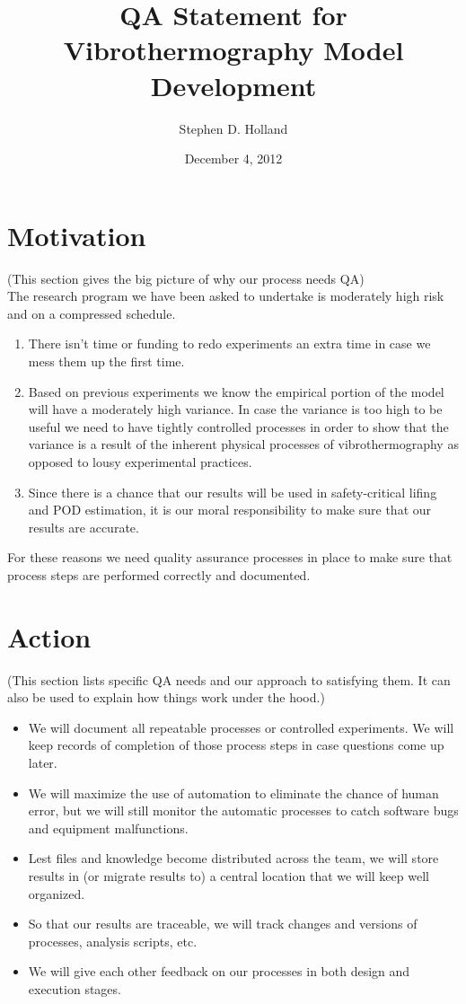 \documentclass{QAstatement}
\begin{document}
\title{QA Statement for Vibrothermography Model Development}
\author{Stephen D. Holland}
\date{December 4, 2012}

\maketitle

\section*{Motivation}
{\small (This section gives the big picture of why our process needs QA)} \\
The research program we have been asked to undertake is moderately 
high risk and on a compressed schedule. 
\begin{enumerate}
  \item There isn't time or funding to redo experiments an extra time in case we mess them up the first time. 
  \item Based on previous experiments we know the empirical portion of the 
model will have a moderately high variance. In case the variance is too 
high to be useful we need to have tightly controlled processes in order
to show that the variance is a result of the inherent physical processes
of vibrothermography as opposed to lousy experimental practices. 
  \item Since there is a chance that our results will be used in 
safety-critical lifing and POD estimation, it is our moral responsibility
to make sure that our results are accurate. 
\end{enumerate}
For these reasons we need quality assurance processes in place to make
sure that process steps are performed correctly and documented. 

\section*{Action}
{\small (This section lists specific QA needs and our 
approach to satisfying them. It can also be used to explain
how things work under the hood.)} \\
\begin{itemize}
\item We will document all repeatable processes or
  controlled experiments. We will keep records of completion of those process
  steps in case questions come up later. 
\item We will maximize the use of automation to eliminate the chance of 
human error, but we will still monitor the automatic processes to catch software bugs and equipment malfunctions.
\item Lest files and knowledge become distributed across the team, we
  will store results in (or migrate results to) a central location
  that we will keep well organized.
\item So that our results are traceable, we will track changes and versions of processes, analysis scripts, etc. 
\item We will give each other feedback on our processes in both design and execution stages. 
\end{itemize}
\end{document}
